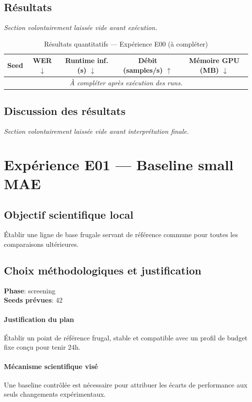 \documentclass[11pt,a4paper]{article}
\begin{document}
\subsection{Résultats}
\textit{Section volontairement laissée vide avant exécution.}

\begin{table}[H]
\centering
\caption{Résultats quantitatifs --- Expérience E00 (à compléter)}
\begin{tabular}{lcccc}
\toprule
Seed & WER $\downarrow$ & Runtime inf. (s) $\downarrow$ & Débit (samples/s) $\uparrow$ & Mémoire GPU (MB) $\downarrow$ \\
\midrule
\multicolumn{5}{c}{\textit{À compléter après exécution des runs.}} \\
\bottomrule
\end{tabular}
\end{table}

\subsection{Discussion des résultats}
\textit{Section volontairement laissée vide avant interprétation finale.}


\section{Expérience E01 --- Baseline small MAE}
\subsection{Objectif scientifique local}
Établir une ligne de base frugale servant de référence commune pour toutes les comparaisons ultérieures.

\subsection{Choix méthodologiques et justification}
\textbf{Phase}: screening\\
\textbf{Seeds prévues}: 42\\


\paragraph{Justification du plan}
Établir un point de référence frugal, stable et compatible avec un profil de budget fixe conçu pour tenir 24h.

\paragraph{Mécanisme scientifique visé}
Une baseline contrôlée est nécessaire pour attribuer les écarts de performance aux seuls changements expérimentaux.
\end{document}
